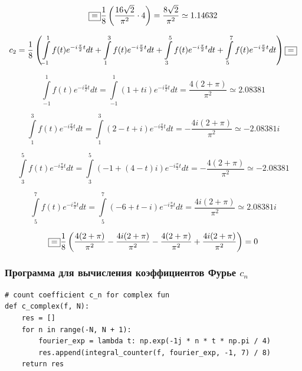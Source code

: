 \documentclass[a5paper, 10pt]{article}
\theoremstyle{definition}
\theoremstyle{plain}
\theoremstyle{remark}
\begin{document}
\begin{equation}
\fbox{=} \frac{1}{8} \left(\frac{16 \sqrt{2}}{\pi^2} \cdot 4 \right) = \frac{8 \sqrt{2}}{\pi^2} \simeq 1.14632
\end{equation}



\begin{multline*}
c_2 =\frac{1}{8} \left(\int \limits_{-1}^{1} f(t) e^{-i \frac{\pi}{2} t}  dt + \int \limits_{1}^{3} f(t) e^{-i \frac{\pi}{2} t} dt + \int \limits_{3}^{5} f(t) e^{-i \frac{\pi}{2} t}  dt 
+ \int \limits_{5}^{7} f(t) e^{-i \frac{\pi}{2} t}  dt   \right) \fbox{=}
\end{multline*}


\begin{equation}
\int \limits_{-1}^{1} f(t) e^{-i \frac{\pi}{2} t} dt = \int \limits_{-1}^{1} \left( 1 + ti  \right) e^{-i \frac{\pi}{2} t}  dt = \frac{4 (2 + \pi)}{\pi^2} \simeq 2.08381
\end{equation}

\begin{equation}
\int \limits_{1}^{3} f(t)e^{-i \frac{\pi}{2} t} dt = \int \limits_{1}^{3} \left( 2 - t + i  \right) e^{-i \frac{\pi}{2} t} dt = -\frac{4i (2 + \pi)}{\pi^2} \simeq -2.08381i
\end{equation}

\begin{equation}
\int \limits_{3}^{5} f(t)e^{-i \frac{\pi}{2} t} dt = \int \limits_{3}^{5} \left( -1 + (4-t)i  \right) e^{-i \frac{\pi}{2} t} dt = -\frac{4 (2 + \pi)}{\pi^2} \simeq -2.08381
\end{equation}

\begin{equation}
\int \limits_{5}^{7} f(t)e^{-i \frac{\pi}{2} t} dt = \int \limits_{5}^{7} \left( - 6 + t - i \right) e^{-i \frac{\pi}{2} t} dt = \frac{4i (2 + \pi)}{\pi^2} \simeq 2.08381i
\end{equation}

\begin{equation}
\fbox{=} \frac{1}{8} \left(  \frac{4 (2 + \pi)}{\pi^2} -\frac{4i (2 + \pi)}{\pi^2} -\frac{4 (2 + \pi)}{\pi^2} +\frac{4i (2 + \pi)}{\pi^2}  \right) =  0
\end{equation}


\subsubsection{Программа для вычисления коэффициентов Фурье $c_n$}


\begin{center}
\begin{lstlisting}[label=some-code,caption={Функция для коэффициентов $c_n$ комплексной функции}]
# count coefficient c_n for complex fun
def c_complex(f, N):
    res = []
    for n in range(-N, N + 1):
        fourier_exp = lambda t: np.exp(-1j * n * t * np.pi / 4)
        res.append(integral_counter(f, fourier_exp, -1, 7) / 8)
    return res
\end{lstlisting}
\end{center}
\end{document}
